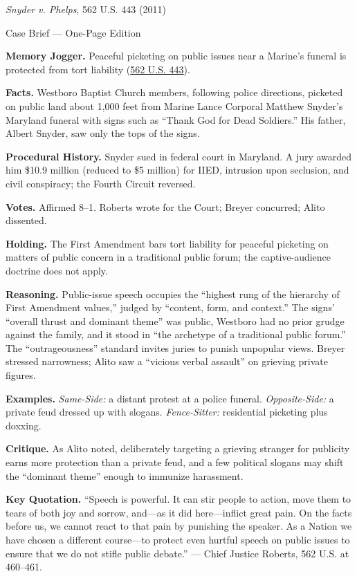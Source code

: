 \documentclass[12pt]{article}
\begin{document}
\begin{center}
{\Large \textit{Snyder v. Phelps}, 562 U.S. 443 (2011)\par}
\vspace{0.3em}
{\normalsize Case Brief --- One-Page Edition\par}
\end{center}

\textbf{Memory Jogger.} Peaceful picketing on public issues near a Marine's funeral is protected from tort liability (\href{https://supreme.justia.com/cases/federal/us/562/443/}{562 U.S. 443}).

\textbf{Facts.} Westboro Baptist Church members, following police directions, picketed on public land about 1,000 feet from Marine Lance Corporal Matthew Snyder's Maryland funeral with signs such as ``Thank God for Dead Soldiers.'' His father, Albert Snyder, saw only the tops of the signs.

\textbf{Procedural History.} Snyder sued in federal court in Maryland. A jury awarded him \$10.9 million (reduced to \$5 million) for IIED, intrusion upon seclusion, and civil conspiracy; the Fourth Circuit reversed.

\textbf{Votes.} Affirmed 8--1. Roberts wrote for the Court; Breyer concurred; Alito dissented.

\textbf{Holding.} The First Amendment bars tort liability for peaceful picketing on matters of public concern in a traditional public forum; the captive-audience doctrine does not apply.

\textbf{Reasoning.} Public-issue speech occupies the ``highest rung of the hierarchy of First Amendment values,'' judged by ``content, form, and context.'' The signs' ``overall thrust and dominant theme'' was public, Westboro had no prior grudge against the family, and it stood in ``the archetype of a traditional public forum.'' The ``outrageousness'' standard invites juries to punish unpopular views. Breyer stressed narrowness; Alito saw a ``vicious verbal assault'' on grieving private figures.

\textbf{Examples.} \emph{Same-Side:} a distant protest at a police funeral. \emph{Opposite-Side:} a private feud dressed up with slogans. \emph{Fence-Sitter:} residential picketing plus doxxing.

\textbf{Critique.} As Alito noted, deliberately targeting a grieving stranger for publicity earns more protection than a private feud, and a few political slogans may shift the ``dominant theme'' enough to immunize harassment.

\textbf{Key Quotation.} ``Speech is powerful. It can stir people to action, move them to tears of both joy and sorrow, and---as it did here---inflict great pain. On the facts before us, we cannot react to that pain by punishing the speaker. As a Nation we have chosen a different course---to protect even hurtful speech on public issues to ensure that we do not stifle public debate.'' --- Chief Justice Roberts, 562 U.S. at 460--461.
\end{document}
